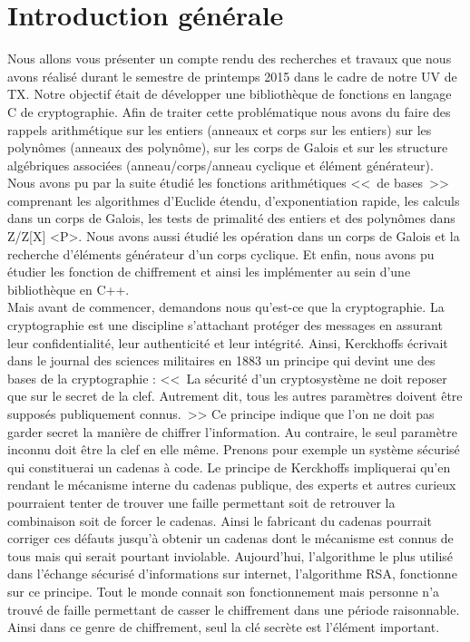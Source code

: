 \chapter{Introduction générale}


Nous allons vous présenter un compte rendu des recherches et travaux que nous avons réalisé durant le semestre de printemps 2015 dans le cadre de notre UV de TX. Notre objectif était de développer une bibliothèque de fonctions en langage C de cryptographie. Afin de traiter cette problématique nous avons du faire des rappels arithmétique sur les entiers (anneaux et corps sur les entiers) sur les polynômes (anneaux des polynôme), sur les corps de Galois et sur les structure algébriques associées (anneau/corps/anneau cyclique et élément générateur). 
Nous avons pu par la suite étudié les fonctions arithmétiques <<~de bases~>> comprenant les algorithmes d'Euclide étendu, d'exponentiation rapide, les calculs dans un corps de Galois, les tests de primalité des entiers et des polynômes dans Z/Z[X] <P>. Nous avons aussi étudié les opération dans un corps de Galois et la recherche d'éléments générateur d'un corps cyclique. Et enfin, nous avons pu étudier les fonction de chiffrement et ainsi les implémenter au sein d’une bibliothèque en C++.\\


Mais avant de commencer, demandons nous qu’est-ce que la cryptographie. La cryptographie est une discipline s’attachant protéger des messages en assurant leur confidentialité, leur authenticité et leur intégrité. Ainsi, Kerckhoffs écrivait dans le journal des sciences militaires en 1883 un principe qui devint une des bases de la cryptographie :  <<~La sécurité d’un cryptosystème ne doit reposer que sur le secret de la clef. Autrement dit, tous les autres paramètres doivent être supposés publiquement connus.~>> Ce principe indique que l’on ne doit pas garder secret la manière de chiffrer l’information. Au contraire, le seul paramètre inconnu doit être la clef en elle même. Prenons pour exemple un système sécurisé qui constituerai un cadenas à code. Le principe de Kerckhoffs impliquerai qu’en rendant le mécanisme interne du cadenas publique, des experts et autres curieux pourraient tenter de trouver une faille permettant soit de retrouver la combinaison soit de forcer le cadenas. Ainsi le fabricant du cadenas pourrait corriger ces défauts jusqu’à obtenir un cadenas dont le mécanisme est connus de tous mais qui serait pourtant inviolable. Aujourd’hui, l’algorithme le plus utilisé dans l’échange sécurisé d’informations sur internet, l’algorithme RSA, fonctionne sur ce principe. Tout le monde connait son fonctionnement mais personne n’a trouvé de faille permettant de casser le chiffrement dans une période raisonnable. Ainsi dans ce genre de chiffrement, seul la clé secrète est l’élément important.\\

